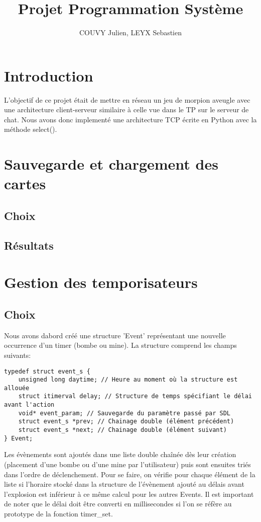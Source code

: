 \documentclass[a4paper]{article}
\title{Projet Programmation Système}
\author{COUVY Julien, LEYX Sebastien}
\begin{document}
\maketitle

\section{Introduction}
L'objectif de ce projet était de mettre en réseau un jeu de morpion aveugle avec une architecture client-serveur similaire à celle vue dans le TP sur le serveur de chat. Nous avons donc implementé une architecture TCP écrite en Python avec la méthode select().

\section{Sauvegarde et chargement des cartes}
\subsection{Choix}
\subsection{Résultats}

\section{Gestion des temporisateurs}
\subsection{Choix}
Nous avons dabord créé une structure 'Event' représentant une nouvelle occurrence d'un timer (bombe ou mine). La structure comprend les champs suivants:

\begin{verbatim}
typedef struct event_s {
    unsigned long daytime; // Heure au moment où la structure est allouée
    struct itimerval delay; // Structure de temps spécifiant le délai avant l'action
    void* event_param; // Sauvegarde du paramètre passé par SDL
    struct event_s *prev; // Chainage double (élément précédent)
    struct event_s *next; // Chainage double (élément suivant)
} Event;
\end{verbatim}

Les évènements sont ajoutés dans une liste double chaînée dès leur création (placement d'une bombe ou d'une mine par l'utilisateur) puis sont ensuites triés dans l'ordre de déclenchement. Pour se faire, on vérifie pour chaque élément de la liste si l'horaire stocké dans la structure de l'évènement ajouté au délais avant l'explosion est inférieur à ce même calcul pour les autres Events. Il est important de noter que le délai doit être converti en millisecondes si l'on se réfère au prototype de la fonction timer\_set.
\end{document}
